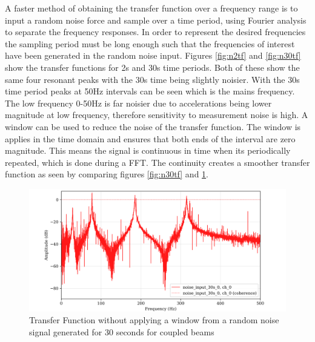 \documentclass[twoside,onecolumn]{article}
\begin{document}
A faster method of obtaining the transfer function over a frequency range is to input a random noise force and sample over a time period, using Fourier analysis to separate the frequency responses. In order to represent the desired frequencies the sampling period must be long enough such that the frequencies of interest have been generated in the random noise input. Figures \ref{fig:n2tf} and \ref{fig:n30tf} show the transfer functions for 2s and 30s time periods. Both of these show the same four resonant peaks with the 30s time being slightly noisier. With the 30s time period peaks at 50Hz intervals can be seen which is the mains frequency. The low frequency 0-50Hz is far noisier due to accelerations being lower magnitude at low frequency, therefore sensitivity to measurement noise is high. A window can be used to reduce the noise of the transfer function. The window is applies in the time domain and ensures that both ends of the interval are zero magnitude. This means the signal is continuous in time when its periodically repeated, which is done during a FFT. The continuity creates a smoother transfer function as seen by comparing figures \ref{fig:n30tf} and \ref{fig:nowindow}.

\begin{figure}[!htb]
  \centering
    \includegraphics[width=\linewidth]{2-updatednowindow}
  \caption{Transfer Function without applying a window from a random noise signal generated for 30 seconds for coupled beams}
  \label{fig:nowindow}
\end{figure}
\end{document}

